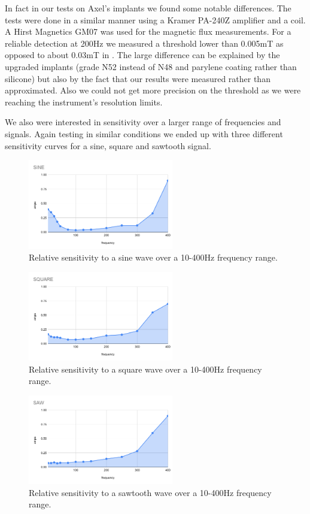 \documentclass[10pt,journal,compsoc]{IEEEtran}
\begin{document}
	In fact in our tests on Axel's implants we found some notable differences. The tests were done in a similar manner using a Kramer PA-240Z amplifier and a coil. A Hirst Magnetics GM07 was used for the magnetic flux measurements. For a reliable detection at 200Hz we measured a threshold lower than 0.005mT as opposed to about 0.03mT in \cite{harrison2018tf}. The large difference can be explained by the upgraded implants (grade N52 instead of N48 and parylene coating rather than silicone) but also by the fact that our results were measured rather than approximated. Also we could not get more precision on the threshold as we were reaching the instrument's resolution limits.
	
	We also were interested in sensitivity over a larger range of frequencies and signals. Again testing in similar conditions we ended up with three different sensitivity curves for a sine, square and sawtooth signal.
	
	\begin{figure}[!t]
		\centering
		\includegraphics[width=2.5in]{SineSensitivity}
		\caption{Relative sensitivity to a sine wave over a 10-400Hz frequency range.}
		\label{SineSensitivity}
	\end{figure}
	
	\begin{figure}[!t]
		\centering
		\includegraphics[width=2.5in]{SquareSensitivity}
		\caption{Relative sensitivity to a square wave over a 10-400Hz frequency range.}
		\label{SquareSensitivity}
	\end{figure}
	
	\begin{figure}[!t]
		\centering
		\includegraphics[width=2.5in]{SawSensitivity}
		\caption{Relative sensitivity to a sawtooth wave over a 10-400Hz frequency range.}
		\label{SawtoothSensitivity}
	\end{figure}
	
\end{document}
